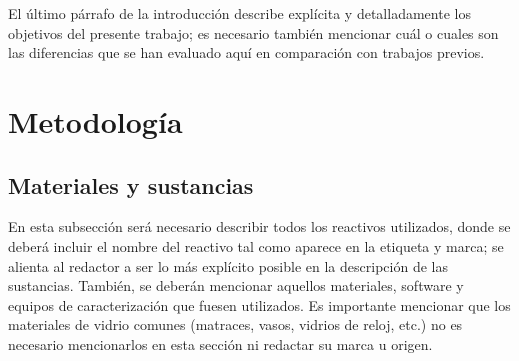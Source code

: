 \documentclass[fleqn,10pt]{SelfArx} %
\begin{document}
El último párrafo de la introducción describe explícita y detalladamente los objetivos del presente trabajo; es necesario también mencionar cuál o cuales son las diferencias que se han evaluado aquí en comparación con trabajos previos.



\section{Metodología} %

\subsection{Materiales y sustancias}

En esta subsección será necesario describir todos los reactivos utilizados, donde se deberá incluir el nombre del reactivo tal como aparece en la etiqueta y marca; se alienta al redactor a ser lo más explícito posible en la descripción de las sustancias. También, se deberán mencionar aquellos materiales, software y equipos de caracterización que fuesen utilizados. Es importante mencionar que los materiales de vidrio comunes (matraces, vasos, vidrios de reloj, etc.) no es necesario mencionarlos en esta sección ni redactar su marca u origen.
\end{document}
